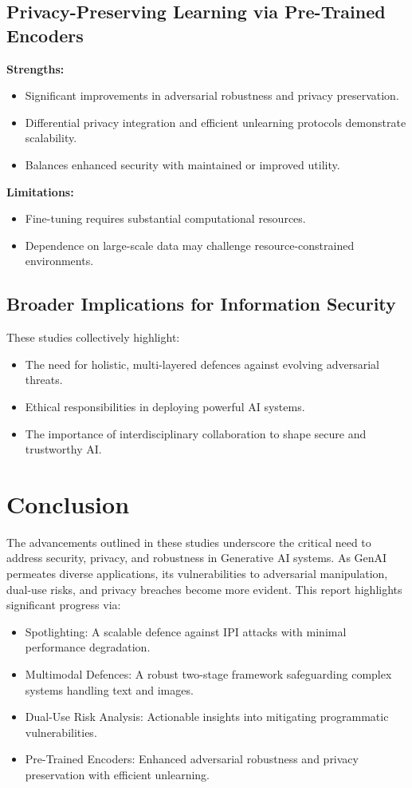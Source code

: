\documentclass[journal]{IEEEtran}  %
\begin{document}
\subsection{Privacy-Preserving Learning via Pre-Trained Encoders}
\textbf{Strengths:}
\begin{itemize}
    \item Significant improvements in adversarial robustness and privacy preservation.
    \item Differential privacy integration and efficient unlearning protocols demonstrate scalability.
    \item Balances enhanced security with maintained or improved utility.
\end{itemize}
\textbf{Limitations:}
\begin{itemize}
    \item Fine-tuning requires substantial computational resources.
    \item Dependence on large-scale data may challenge resource-constrained environments.
\end{itemize}

\subsection*{Broader Implications for Information Security}
These studies collectively highlight:
\begin{itemize}
    \item The need for holistic, multi-layered defences against evolving adversarial threats.
    \item Ethical responsibilities in deploying powerful AI systems.
    \item The importance of interdisciplinary collaboration to shape secure and trustworthy AI.
\end{itemize}

\section{Conclusion}

The advancements outlined in these studies underscore the critical need to address security, privacy, and robustness in Generative AI systems. As GenAI permeates diverse applications, its vulnerabilities to adversarial manipulation, dual-use risks, and privacy breaches become more evident. This report highlights significant progress via:
\begin{itemize}
    \item Spotlighting: A scalable defence against IPI attacks with minimal performance degradation.
    \item Multimodal Defences: A robust two-stage framework safeguarding complex systems handling text and images.
    \item Dual-Use Risk Analysis: Actionable insights into mitigating programmatic vulnerabilities.
    \item Pre-Trained Encoders: Enhanced adversarial robustness and privacy preservation with efficient unlearning.
\end{itemize}
\end{document}
